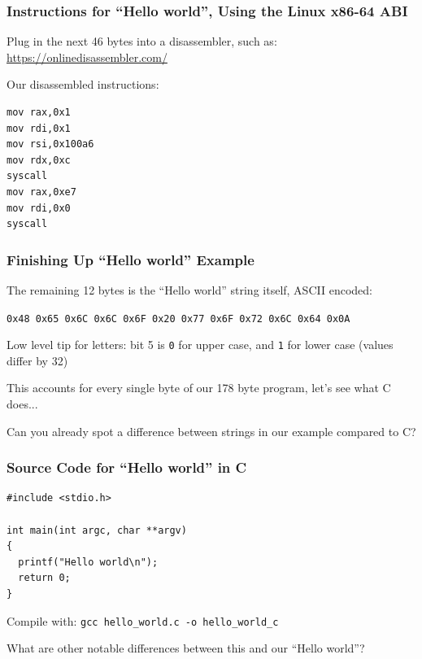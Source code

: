 \documentclass[aspectratio=169]{beamer}
\begin{document}
  \begin{frame}[fragile]
    \frametitle{Instructions for ``Hello world'', Using the Linux x86-64 ABI}

    Plug in the next 46 bytes into a disassembler, such as:
    \url{https://onlinedisassembler.com/}

    \vspace{2em}

    Our disassembled instructions:
    \begin{lstlisting}[basicstyle=\small\ttfamily]
mov rax,0x1
mov rdi,0x1
mov rsi,0x100a6
mov rdx,0xc
syscall
mov rax,0xe7
mov rdi,0x0
syscall
    \end{lstlisting}
  \end{frame}

  \begin{frame}
    \frametitle{Finishing Up ``Hello world'' Example}

    The remaining 12 bytes is the ``Hello world'' string itself, ASCII encoded:
    
    \texttt{0x48 0x65 0x6C 0x6C 0x6F 0x20 0x77 0x6F 0x72 0x6C 0x64 0x0A}

    \vspace{1em}

    \hspace{1em} Low level tip for letters: bit 5 is \texttt{0} for upper case,
    and \texttt{1} for lower case (values differ by 32)

    \vspace{2em}

    This accounts for every single byte of our 178 byte program, let's see what
    C does...

    \vspace{2em}
    Can you already spot a difference between strings in our example compared to
    C?
  \end{frame}

  \begin{frame}[fragile]
    \frametitle{Source Code for ``Hello world'' in C}

    \begin{lstlisting}[basicstyle=\ttfamily]
#include <stdio.h>

int main(int argc, char **argv)
{
  printf("Hello world\n");
  return 0;
}
    \end{lstlisting}

    Compile with: \hspace{0.5em} \texttt{gcc hello\_world.c -o hello\_world\_c}

    \vspace{2em}

    What are other notable differences between this and our ``Hello world''?
  \end{frame}
\end{document}
